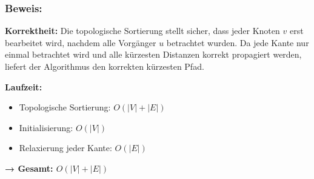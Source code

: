 \subsubsection{Beweis:}
\textbf{Korrektheit:}  
Die topologische Sortierung stellt sicher, dass jeder Knoten \( v \) erst bearbeitet wird, nachdem alle Vorgänger \( u \) betrachtet wurden. Da jede Kante nur einmal betrachtet wird und alle kürzesten Distanzen korrekt propagiert werden, liefert der Algorithmus den korrekten kürzesten Pfad.

\vspace{1em}

\textbf{Laufzeit:}
\begin{itemize}
	\item Topologische Sortierung: \( O(|V| + |E|) \)
	\item Initialisierung: \( O(|V|) \)
	\item Relaxierung jeder Kante: \( O(|E|) \)
\end{itemize}
\textbf{→ Gesamt: \( O(|V| + |E|) \)}